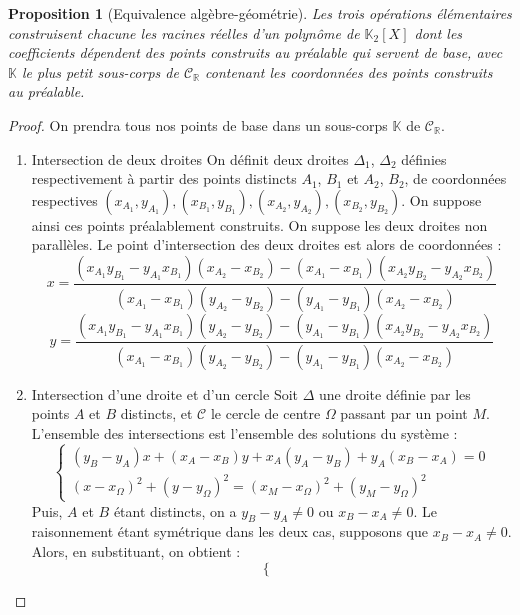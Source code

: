 \documentclass[a4paper,12pt,french]{report}
\newtheorem{proposition}{Proposition}[section]
\begin{document}
		\begin{proposition}[Equivalence algèbre-géométrie]
				Les trois opérations élémentaires construisent chacune les racines réelles d'un polynôme de \(\mathbb{K}_2[X]\) dont les coefficients dépendent des points construits au préalable qui servent de base, avec $\mathbb{K}$ le plus petit sous-corps de $\mathscr{C}_\mathbb{R}$ contenant les coordonnées des points construits au préalable.
		\end{proposition}
			\begin{proof}
					On prendra tous nos points de base dans un sous-corps $\mathbb{K}$ de $\mathscr{C}_\mathbb{R}$.
					\begin{enumerate}
						\item{Intersection de deux droites}
							On définit deux droites \( \Delta_1 \), \( \Delta_2 \) définies respectivement à partir des points distincts \(A_1\), \(B_1\) et \(A_2\), \(B_2\), de coordonnées respectives \( (x_{A_1}, y_{A_1}), (x_{B_1}, y_{B_1}), (x_{A_2}, y_{A_2}), (x_{B_2}, y_{B_2})\). On suppose ainsi ces points préalablement construits. On suppose les deux droites non parallèles. Le point d'intersection des deux droites est alors de coordonnées :
							\[
							x = \frac{(x_{A_1} y_{B_1}-y_{A_1} x_{B_1})(x_{A_2}-x_{B_2})-(x_{A_1}-x_{B_1})(x_{A_2} y_{B_2}-y_{A_2} x_{B_2})}{(x_{A_1}-x_{B_1})(y_{A_2}-y_{B_2})-(y_{A_1}-y_{B_1})(x_{A_2}-x_{B_2})}	
							\]
							\[ y=\frac{(x_{A_1}y_{B_1}-y_{A_1}								x_{B_1})(y_{A_2}-y_{B_2})-(y_{A_1}-y_{B_1})(x_{A_2} y_{B_2}-y_{A_2} x_{B_2})}{(x_{A_1}-x_{B_1})(y_{A_2}-y_{B_2})-(y_{A_1}-y_{B_1})(x_{A_2}-x_{B_2})}
							\]		
						\item{Intersection d'une droite et d'un cercle} Soit $\Delta$ une droite définie par les points $A$ et $B$ distincts, et $\mathcal{C}$ le cercle de centre $\Omega$ passant par un point $M$. L'ensemble des intersections est l'ensemble des solutions du système :
							\[
							\left \{
							\begin{array}{ll}
								(y_B - y_A)x + (x_A - x_B)y + x_A(y_A - y_B) + y_A(x_B-x_A) = 0
								\\
								(x-x_\Omega)^2 + (y-y_\Omega)^2 = (x_M - x_\Omega)^2 + (y_M - y_\Omega)^2
							\end{array}
							\right.
							\]
						Puis, $A$ et $B$ étant distincts, on a \(y_B - y_A \neq 0\) ou \(x_B - x_A \neq 0\). Le raisonnement étant symétrique dans les deux cas, supposons que \(x_B - x_A \neq 0\). Alors, en substituant, on obtient :
							\[
							\left \{
							\begin{array}{lllll}

\end{array}\]
\end{enumerate}
\end{proof}
\end{document}
